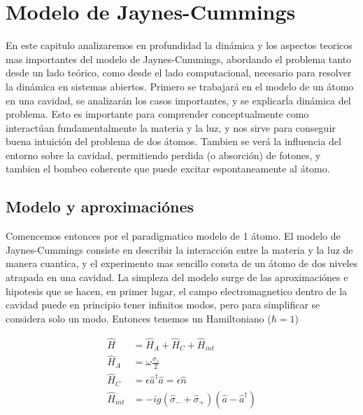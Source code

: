 \chapter{Modelo de Jaynes-Cummings}
\label{ch3_jcm}

\pagestyle{fancy}
\fancyhf{}
\fancyhead[LE]{\nouppercase{\rightmark\hfill}}
\fancyhead[RO]{\nouppercase{\leftmark\hfill}}
\fancyfoot[LE,RO]{\hfill\thepage\hfill}

En este capitulo analizaremos en profundidad la din\'amica y los aspectos teoricos mas importantes 
del modelo de Jaynes-Cummings, abordando el problema tanto desde un lado te\'orico, como desde
el lado computacional, necesario para resolver la din\'amica en sistemas abiertos.
Primero se trabajar\'a en el modelo de un átomo en una cavidad, se analizar\'an los casos importantes,
y se explicar\' la din\'amica del problema. Esto es importante para comprender conceptualmente como
interact\'uan fundamentalmente la materia y la luz, y nos sirve para conseguir buena intuici\'on del
problema de dos átomos. Tambien se ver\'a la influencia del entorno sobre la cavidad, permitiendo
perdida (o absorci\'on) de fotones, y tambien el bombeo coherente que puede excitar espontaneamente
al átomo. \newline

\section{Modelo y aproximaciónes}
Comencemos entonces por el paradigmatico modelo de 1 átomo. El modelo de Jaynes-Cummings consiste en describir la interacción entre la materia y la luz de manera cuantica, y el experimento mas sencillo consta de un átomo de dos niveles atrapada en una cavidad. La simpleza del modelo surge de las aproximaciónes e hipotesis que se hacen, en primer lugar, el campo electromagnetico dentro de la cavidad puede en principio tener infinitos modos, pero para simplificar se considera solo un modo. 
Entonces tenemos un Hamiltoniano ($\hbar = 1$)

\begin{align*}
\hat H & = \hat H_A + \hat H_C + \hat H_{int}  \\
\hat H_A &= \omega \frac{\sigma_z}{2} \\
\hat H_C &= \epsilon \hat a^\dagger\hat a = \epsilon \hat n \\
\hat H_{int} &= -i g (\hat\sigma_-+\hat \sigma_+)(\hat a - \hat a^\dagger)
\end{align*}

